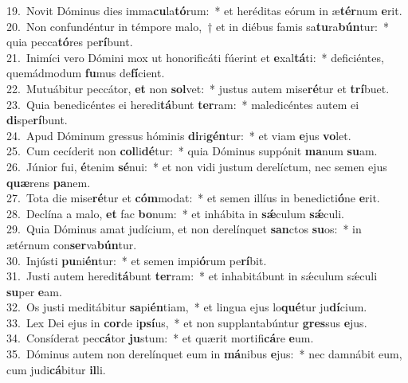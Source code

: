 {19.~}Novit Dóminus dies imma\textbf{cu}la\textbf{tó}rum:~* et heréditas eórum in æ\textbf{tér}num \textbf{e}rit.\\
{20.~}Non confundéntur in témpore malo,~† et in diébus famis sa\textbf{tu}ra\textbf{bún}tur:~* quia pecca\textbf{tó}res pe\textbf{rí}bunt.\\
{21.~}Inimíci vero Dómini mox ut honorificáti fúerint et \textbf{e}xal\textbf{tá}ti:~* deficiéntes, quemádmodum \textbf{fu}mus de\textbf{fí}cient.\\
{22.~}Mutuábitur peccátor, \textbf{et} non \textbf{sol}vet:~* justus autem mise\textbf{ré}tur et \textbf{trí}buet.\\
{23.~}Quia benedicéntes ei heredi\textbf{tá}bunt \textbf{ter}ram:~* maledicéntes autem ei \textbf{di}spe\textbf{rí}bunt.\\
{24.~}Apud Dóminum gressus hóminis \textbf{di}ri\textbf{gén}tur:~* et viam \textbf{e}jus \textbf{vo}let.\\
{25.~}Cum cecíderit non \textbf{col}li\textbf{dé}tur:~* quia Dóminus suppónit \textbf{ma}num \textbf{su}am.\\
{26.~}Júnior fui, \textbf{é}tenim \textbf{sé}nui:~* et non vidi justum derelíctum, nec semen ejus \textbf{quæ}rens \textbf{pa}nem.\\
{27.~}Tota die mise\textbf{ré}tur et \textbf{cóm}modat:~* et semen illíus in benedicti\textbf{ó}ne \textbf{e}rit.\\
{28.~}Declína a malo, \textbf{et} fac \textbf{bo}num:~* et inhábita in \textbf{sǽ}culum \textbf{sǽ}culi.\\
{29.~}Quia Dóminus amat judícium, et non derelínquet \textbf{san}ctos \textbf{su}os:~* in ætérnum con\textbf{ser}va\textbf{bún}tur.\\
{30.~}Injústi \textbf{pu}ni\textbf{én}tur:~* et semen impi\textbf{ó}rum pe\textbf{rí}bit.\\
{31.~}Justi autem heredi\textbf{tá}bunt \textbf{ter}ram:~* et inhabitábunt in sǽculum sǽculi \textbf{su}per \textbf{e}am.\\
{32.~}Os justi meditábitur \textbf{sa}pi\textbf{én}tiam,~* et lingua ejus lo\textbf{qué}tur ju\textbf{dí}cium.\\
{33.~}Lex Dei ejus in \textbf{cor}de i\textbf{psí}us,~* et non supplantabúntur \textbf{gres}sus \textbf{e}jus.\\
{34.~}Consíderat pec\textbf{cá}tor \textbf{ju}stum:~* et quærit mortifi\textbf{cá}re \textbf{e}um.\\
{35.~}Dóminus autem non derelínquet eum in \textbf{má}nibus \textbf{e}jus:~* nec damnábit eum, cum judi\textbf{cá}bitur \textbf{il}li.\\
